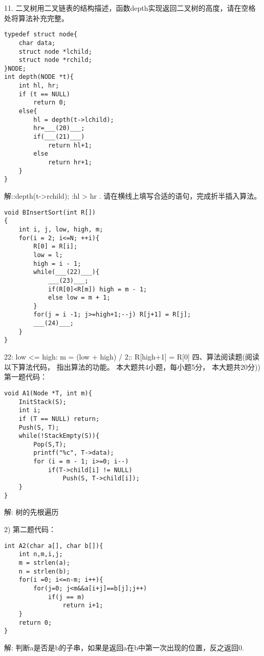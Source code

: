 11. 二叉树用二叉链表的结构描述，函数depth实现返回二叉树的高度，请在空格处将算法补充完整。
\begin{lstlisting}[basicstyle=\small\ttfamily, caption={}, numbers=none]
typedef struct node{
	char data;
	struct node *lchild;
	struct node *rchild;
}NODE;
int depth(NODE *t){
	int hl, hr;
	if (t == NULL)
		return 0;
	else{
		hl = depth(t->lchild);
		hr=___(20)___;
		if(___(21)___)
			return hl+1;
		else
			return hr+1;
	}
}
\end{lstlisting}
解::depth(t->rchild); :hl > hr . 请在横线上填写合适的语句，完成折半插入算法。\newline

\begin{lstlisting}[basicstyle=\small\ttfamily, caption={}, numbers=none]
void BInsertSort(int R[])
{
	int i, j, low, high, m;
	for(i = 2; i<=N; ++i){
		R[0] = R[i];
		low = l;
		high = i - 1;
		while(___(22)___){
			___(23)___;
			if(R[0]<R[m]) high = m - 1;
			else low = m + 1;
		}
		for(j = i -1; j>=high+1;--j) R[j+1] = R[j];
		___(24)___;
	}
}
\end{lstlisting}
22: low <= high: m = (low + high) / 2;: R[high+1] = R[0]\newline
四、算法阅读题(阅读以下算法代码， 指出算法的功能。 本大题共4小题，每小题5分， 本大题共20分)) 第一题代码：\newline
\begin{lstlisting}[basicstyle=\small\ttfamily, caption={}, numbers=none]
void A1(Node *T, int m){
	InitStack(S);
	int i;
	if (T == NULL) return;
	Push(S, T);
	while(!StackEmpty(S)){
		Pop(S,T);
		printf("%c", T->data);
		for (i = m - 1; i>=0; i--)
			if(T->child[i] != NULL)
				Push(S, T->child[i]);
	}
}
\end{lstlisting}
解:\newline
树的先根遍历\newline

2) 第二题代码：\newline
\begin{lstlisting}[basicstyle=\small\ttfamily, caption={}, numbers=none]
int A2(char a[], char b[]){
	int n,m,i,j;
	m = strlen(a);
	n = strlen(b);
	for(i =0; i<=n-m; i++){
		for(j=0; j<m&&a[i+j]==b[j];j++)
			if(j == m)
				return i+1;
	}
	return 0;
}
\end{lstlisting}
解:\newline
判断a是否是b的子串，如果是返回a在b中第一次出现的位置，反之返回0.\newline

